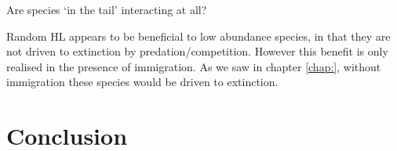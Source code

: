 Are species `in the tail' interacting at all?

Random HL appears to be beneficial to low abundance species, in that they are not driven to extinction by predation/competition. However this benefit is only realised in the presence of immigration. As we saw in chapter \ref{chap:}, without immigration these species would be driven to extinction.

\section{Conclusion}
\label{sec:vir_conclusion}

%
%
%
